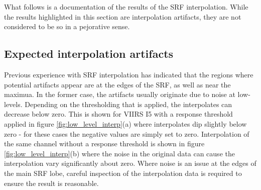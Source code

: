 What follows is a documentation of the results of the SRF interpolation. While the results highlighted in this section are interpolation artifacts, they are not considered to be so in a pejorative sense.

\subsection{Expected interpolation artifacts}
Previous experience with SRF interpolation has indicated that the regions where potential artifacts appear are at the edges of the SRF, as well as near the maximua. In the former case, the artifacts usually originate due to noise at low-levels. Depending on the thresholding that is applied, the interpolates can decrease below zero. This is shown for VIIRS I5 with a response threshold applied in figure \ref{fig:low_level_interp}(a) where interpolates dip slightly below zero - for these cases the negative values are simply set to zero. Interpolation of the same channel without a response threshold is shown in figure \ref{fig:low_level_interp}(b) where the noise in the original data can cause the interpolation vary significantly about zero. Where noise is an issue at the edges of the main SRF lobe, careful inspection of the interpolation data is required to ensure the result is reasonable. 

